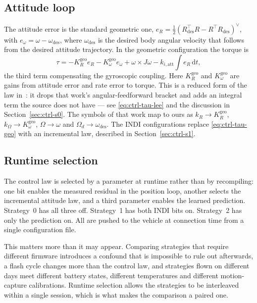 \subsection{Attitude loop}

The attitude error is the standard geometric one,
$e_R = \tfrac{1}{2}\left(R_{\mathrm{des}}^\top R - R^\top R_{\mathrm{des}}\right)^\vee$, with
$e_\omega = \omega - \omega_{\mathrm{des}}$, where $\omega_{\mathrm{des}}$ is the desired body angular
velocity that follows from the desired attitude trajectory. In the geometric configuration the torque is
%
\begin{equation}
  \tau = -K_R^{\mathrm{geo}} e_R - K_\omega^{\mathrm{geo}} e_\omega + \omega \times J\omega
         - k_{i,\mathrm{att}} \textstyle\int e_R \, \mathrm{d}t,
  \label{eq:ctrl-tau-geo}
\end{equation}
%
the third term compensating the gyroscopic coupling. Here $K_R^{\mathrm{geo}}$ and
$K_\omega^{\mathrm{geo}}$ are gains from attitude error and rate error to torque. This is a reduced form of the law
in~\cite{lee2010geometrictracking}: it drops that work's angular-feedforward bracket and adds an
integral term the source does not have --- see \eqref{eq:ctrl-tau-lee} and the discussion in
Section~\ref{sec:ctrl-s0}. The symbols of that work map to ours as $k_R \to K_R^{\mathrm{geo}}$,
$k_\Omega \to K_\omega^{\mathrm{geo}}$, $\Omega \to \omega$ and $\Omega_d \to \omega_{\mathrm{des}}$. The INDI configurations replace
\eqref{eq:ctrl-tau-geo} with an incremental law, described in Section~\ref{sec:ctrl-s1}.

\subsection{Runtime selection}
\label{sec:ctrl-runtime}

The control law is selected by a parameter at runtime rather than by recompiling: one bit enables
the measured residual in the position loop, another selects the incremental attitude law, and a
third parameter enables the learned prediction. Strategy~0 has all three off. Strategy~1 has both
INDI bits on. Strategy~2 has only the prediction on. All are pushed to the vehicle at connection time
from a single configuration file.

This matters more than it may appear. Comparing strategies that require different firmware
introduces a confound that is impossible to rule out afterwards, a flash cycle changes more than
the control law, and strategies flown on different days meet different battery states, different
temperatures and different motion-capture calibrations. Runtime selection allows the strategies to
be interleaved within a single session, which is what makes the comparison a paired one.

